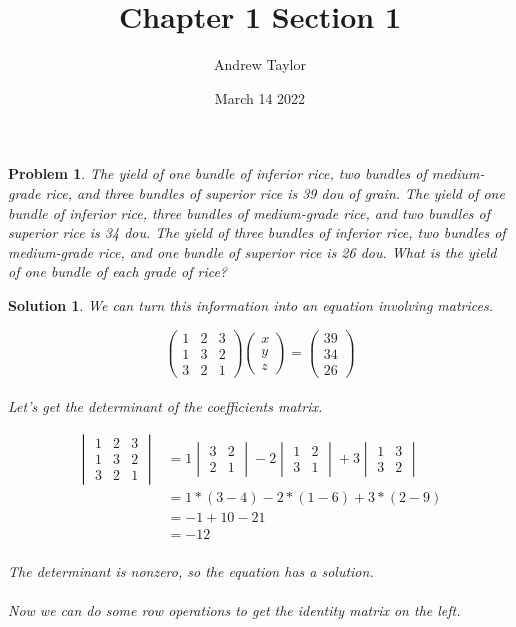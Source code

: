 \documentclass{article}
\title{Chapter 1 Section 1}
\author{Andrew Taylor}
\date{March 14 2022}
\newtheorem*{problem}{Problem}
\newtheorem*{solution}{Solution}
\begin{document}
\maketitle

\begin{problem}
The yield of one bundle of inferior rice, two bundles of medium-grade rice, and three bundles of superior rice is 39 dou of grain. The yield of one bundle of inferior rice, three bundles of medium-grade rice, and two bundles of superior rice is 34 dou. The yield of three bundles of inferior rice, two bundles of medium-grade rice, and one bundle of superior rice is 26 dou. What is the yield of one bundle of each grade of rice?
\end{problem}

\begin{solution}
We can turn this information into an equation involving matrices.

\begin{equation*}
\begin{pmatrix}
1 & 2 & 3 \\
1 & 3 & 2 \\
3 & 2 & 1
\end{pmatrix}
\begin{pmatrix}
x \\ 
y \\
z
\end{pmatrix}
=
\begin{pmatrix}
39 \\
34 \\
26
\end{pmatrix}
\end{equation*} \\

Let's get the determinant of the coefficients matrix.

\begin{align*}
\begin{vmatrix}
1 & 2 & 3 \\
1 & 3 & 2 \\
3 & 2 & 1
\end{vmatrix}
&= 
1 \begin{vmatrix}3 & 2 \\ 2 & 1\end{vmatrix} 
- 2 \begin{vmatrix} 1 & 2 \\ 3 & 1\end{vmatrix}
+ 3 \begin{vmatrix}1 & 3 \\ 3 & 2\end{vmatrix} \\
&= 1 * (3 - 4) - 2 * (1 - 6) + 3 * (2 - 9) \\
&= -1 + 10 - 21 \\
&= -12
\end{align*}
\\
The determinant is nonzero, so the equation has a solution.
\\
\\
Now we can do some row operations to get the identity matrix on the left.


\end{solution}
\end{document}
